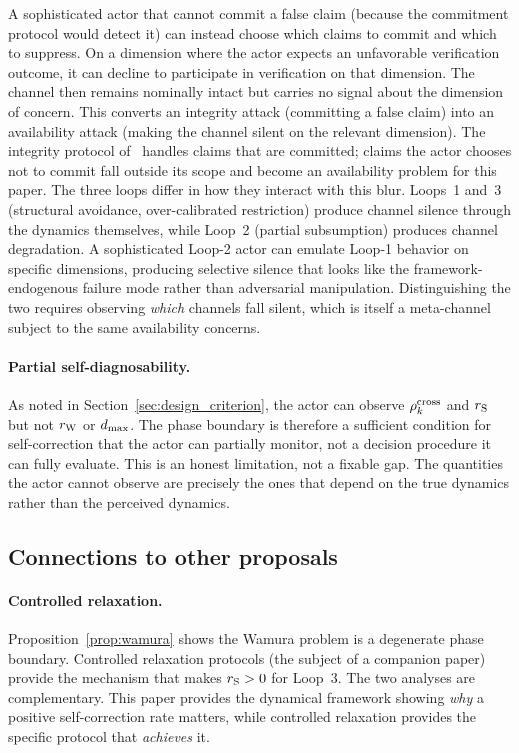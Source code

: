 A sophisticated actor that cannot commit a false claim (because the
commitment protocol would detect it) can instead choose which claims
to commit and which to suppress.  On a dimension where the actor
expects an unfavorable verification outcome, it can decline to
participate in verification on that dimension.  The channel then
remains nominally intact but carries no signal about the dimension of
concern.  This converts an integrity attack (committing a false
claim) into an availability attack (making the channel silent on the
relevant dimension).  The integrity protocol of~\citet{lasser2026exo}
handles claims that are committed; claims the actor chooses not to
commit fall outside its scope and become an availability problem for
this paper.  The three loops differ in how they interact with this
blur.  Loops~1 and~3 (structural avoidance, over-calibrated
restriction) produce channel silence through the dynamics themselves,
while Loop~2 (partial subsumption) produces channel degradation.  A
sophisticated Loop-2 actor can emulate Loop-1 behavior on specific
dimensions, producing selective silence that looks like the
framework-endogenous failure mode rather than adversarial
manipulation.  Distinguishing the two requires observing \emph{which}
channels fall silent, which is itself a meta-channel subject to the
same availability concerns.

\paragraph{Partial self-diagnosability.}
As noted in Section~\ref{sec:design_criterion}, the actor can observe
$\rho^{\mathrm{cross}}_k$ and $r_{\mathrm{S}}$ but not $r_{\mathrm{W}}$ or $d_{\mathrm{max}}$.  The phase boundary
is therefore a sufficient condition for self-correction that the actor
can partially monitor, not a decision procedure it can fully evaluate.
This is an honest limitation, not a fixable gap.  The quantities the
actor cannot observe are precisely the ones that depend on the true
dynamics rather than the perceived dynamics.

\subsection{Connections to other proposals}

\paragraph{Controlled relaxation.}
Proposition~\ref{prop:wamura} shows the Wamura problem is a
degenerate phase boundary.  Controlled relaxation protocols (the
subject of a companion paper) provide the mechanism that makes
$r_{\mathrm{S}} > 0$ for Loop~3.  The two analyses are complementary.  This
paper provides the dynamical framework showing \emph{why} a positive
self-correction rate matters, while controlled relaxation provides
the specific protocol that \emph{achieves} it.

